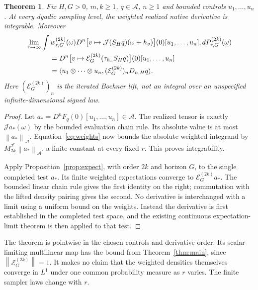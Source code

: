 \documentclass[11pt]{article}
\newtheorem{theorem}{Theorem}[section]
\theoremstyle{remark}\newtheorem{remark}[theorem]{Remark}
\newcommand{\A}{\mathcal A}\newcommand{\X}{\mathcal X}
\newcommand{\E}{\mathcal E}\newcommand{\norm}[1]{\left\lVert#1\right\rVert}
\begin{document}
\begin{theorem}\label{thm:weighted}
Fix $H,G>0$, $m,k\ge1$, $q\in\A$, $n\ge1$ and bounded controls $u_1,\ldots,u_n$. At every dyadic sampling level, the weighted realized native derivative is integrable. Moreover
\begin{align*}
 &\lim_{r\to\infty}\int w^{(2k)}_{r,G}(\omega)
 D^n\big[v\mapsto\mathcal J(S_Hq)(\omega+h_v)\big](0)
 [u_1,\ldots,u_n],dP^{(2k)}_{r,G}(\omega)\\
 &\hspace{12mm}=D^n\big[v\mapsto\E^{(2k)}_G(\tau_{h_v}S_Hq)\big](0)
 [u_1,\ldots,u_n]\\
 &\hspace{12mm}=\langle u_1\otimes\cdots\otimes u_n,
        (\E^{(2k)}_G)_n D_{n,H}q\rangle.
\end{align*}
Here $(\E^{(2k)}_G)_n$ is the iterated Bochner lift, not an integral over an unspecified infinite-dimensional signed law.
\end{theorem}
\begin{proof}
Let $a_*=D^nF_q(0)[u_1,\ldots,u_n]\in\A$. The realized tensor is exactly $\mathcal J a_*(\omega)$ by the bounded evaluation chain rule. Its absolute value is at most $\norm{a_*}_{\A}$. Equation~\eqref{eq:weights} now bounds the absolute weighted integrand by $M_{2k}^{2^r}\norm{a_*}_{\A}$, a finite constant at every fixed $r$. This proves integrability.

Apply Proposition~\ref{prop:expect}, with order $2k$ and horizon $G$, to the single completed test $a_*$. Its finite weighted expectations converge to $\E^{(2k)}_G a_*$. The bounded linear chain rule gives the first identity on the right; commutation with the lifted density pairing gives the second. No derivative is interchanged with a limit using a uniform bound on the weights. Instead the derivative is first established in the completed test space, and the existing continuous expectation-limit theorem is then applied to that test.
\end{proof}

The theorem is pointwise in the chosen controls and derivative order. Its scalar limiting multilinear map has the bound from Theorem~\ref{thm:main}, since $\norm{\E^{(2k)}_G}=1$. It makes no claim that the weighted densities themselves converge in $L^1$ under one common probability measure as $r$ varies. The finite sampler laws change with $r$.
\end{document}
